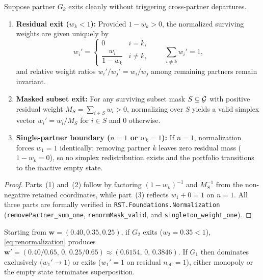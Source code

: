 \begin{proposition}
\label{prop:renormalization}
Suppose partner $G_k$ exits cleanly without triggering cross-partner departures.
\begin{enumerate}[nosep]
  \item \textbf{Residual exit ($w_k < 1$):} Provided $1 - w_k > 0$, the normalized
        surviving weights are given uniquely by
        \begin{equation}
          w_i' = \begin{cases}
            0 & i = k, \\
            \dfrac{w_i}{1 - w_k} & i \neq k,
          \end{cases}
          \qquad \sum_{i \neq k} w_i' = 1,
          \label{eq:renormalization}
        \end{equation}
        and relative weight ratios $w_i' / w_j' = w_i / w_j$ among remaining partners remain invariant.
  \item \textbf{Masked subset exit:} For any surviving subset mask $S \subseteq \mathcal{G}$
        with positive residual weight $M_S = \sum_{i \in S} w_i > 0$, normalizing over $S$ yields
        a valid simplex vector $w_i' = w_i / M_S$ for $i \in S$ and $0$ otherwise.
  \item \textbf{Single-partner boundary ($n = 1$ or $w_k = 1$):} If $n = 1$, normalization forces
        $w_1 = 1$ identically; removing partner $k$ leaves zero residual mass ($1 - w_k = 0$),
        so no simplex redistribution exists and the portfolio transitions to the inactive empty state.
\end{enumerate}
\end{proposition}
\begin{proof}
Parts~(1) and~(2) follow by factoring $(1 - w_k)^{-1}$ and $M_S^{-1}$ from the non-negative
retained coordinates, while part~(3) reflects $w_1 + 0 = 1$ on $n = 1$. All three parts are
formally verified in \texttt{RST.Foundations.Normalization} (\texttt{removePartner\_sum\_one},
\texttt{renormMask\_valid}, and \texttt{singleton\_weight\_one}).
\end{proof}

\begin{example}
\label{ex:renorm-triad}
Starting from $\mathbf{w} = (0.40, 0.35, 0.25)$, if $G_2$ exits ($w_2 = 0.35 < 1$),
\eqref{eq:renormalization} produces $\mathbf{w}' = (0.40/0.65,\, 0,\, 0.25/0.65)
\approx (0.6154,\, 0,\, 0.3846)$. If $G_1$ then dominates exclusively ($w_1' \to 1$) or
exits ($w_1' = 1$ on residual $n_{\mathrm{eff}} = 1$), either monopoly or the empty
state terminates superposition.
\end{example}

